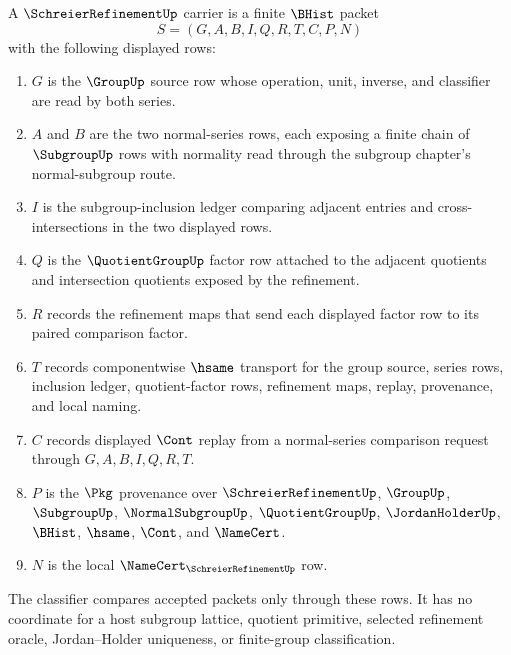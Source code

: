 \begin{definition}
\label{def:schreier-refinement-carrier}
A $\SchreierRefinementUp$ carrier is a finite $\BHist$ packet
$$
S=(G,A,B,I,Q,R,T,C,P,N)
$$
with the following displayed rows:
\begin{enumerate}
\item $G$ is the $\GroupUp$ source row whose operation, unit, inverse, and classifier are read by both series.
\item $A$ and $B$ are the two normal-series rows, each exposing a finite chain of $\SubgroupUp$ rows with normality read through the subgroup chapter's normal-subgroup route.
\item $I$ is the subgroup-inclusion ledger comparing adjacent entries and cross-intersections in the two displayed rows.
\item $Q$ is the $\QuotientGroupUp$ factor row attached to the adjacent quotients and intersection quotients exposed by the refinement.
\item $R$ records the refinement maps that send each displayed factor row to its paired comparison factor.
\item $T$ records componentwise $\hsame$ transport for the group source, series rows, inclusion ledger, quotient-factor rows, refinement maps, replay, provenance, and local naming.
\item $C$ records displayed $\Cont$ replay from a normal-series comparison request through $G,A,B,I,Q,R,T$.
\item $P$ is the $\Pkg$ provenance over $\SchreierRefinementUp$, $\GroupUp$, $\SubgroupUp$, $\NormalSubgroupUp$, $\QuotientGroupUp$, $\JordanHolderUp$, $\BHist$, $\hsame$, $\Cont$, and $\NameCert$.
\item $N$ is the local $\NameCert_{\SchreierRefinementUp}$ row.
\end{enumerate}
The classifier compares accepted packets only through these rows. It has no coordinate for a host subgroup lattice, quotient primitive, selected refinement oracle, Jordan--Holder uniqueness, or finite-group classification.
\end{definition}

